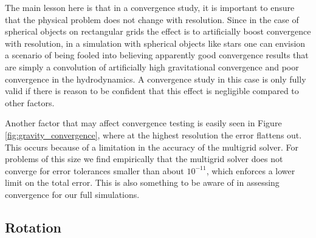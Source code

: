 \documentclass[12pt,preprint]{aastex}
\begin{document}
The main lesson here is that in a convergence study, it is important to ensure that the physical problem does not change with resolution. Since in the case of spherical objects on rectangular grids the effect is to artificially boost convergence with resolution, in a simulation with spherical objects like stars one can envision a scenario of being fooled into believing apparently good convergence results that are simply a convolution of artificially high gravitational convergence and poor convergence in the hydrodynamics. A convergence study in this case is only fully valid if there is reason to be confident that this effect is negligible compared to other factors.

Another factor that may affect convergence testing is easily seen in Figure \ref{fig:gravity_convergence}, where at the highest resolution the error flattens out. This occurs because of a limitation in the accuracy of the multigrid solver. For problems of this size we find empirically that the multigrid solver does not converge for error tolerances smaller than about $10^{-11}$, which enforces a lower limit on the total error. This is also something to be aware of in assessing convergence for our full simulations.

\subsection{Rotation}\label{sec:rotation}
\end{document}
